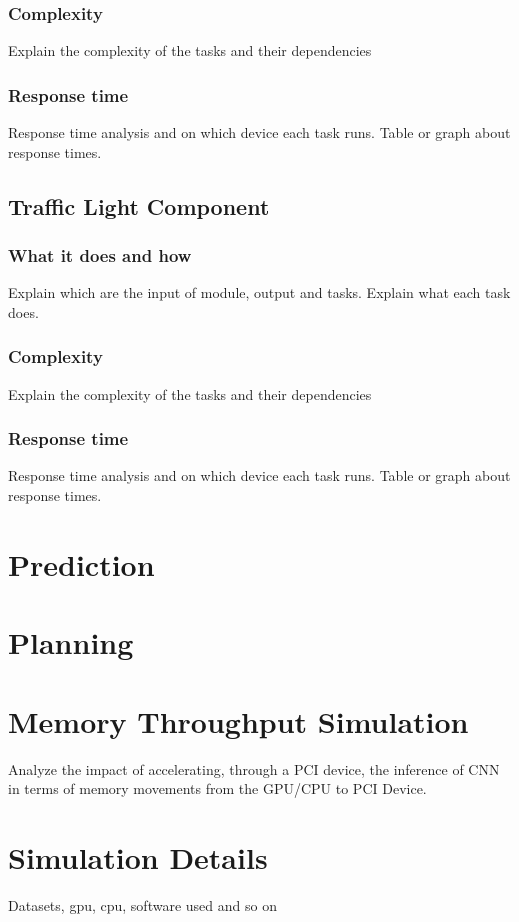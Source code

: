 \documentclass[conference]{IEEEtran}
\begin{document}
\subsubsection{Complexity}
Explain the complexity of the tasks and their dependencies
\subsubsection{Response time}
Response time analysis and on which device each task runs.
Table or graph about response times.

\subsection{Traffic Light Component}

\subsubsection{What it does and how}
Explain which are the input of module, output and tasks.
Explain what each task does.
\subsubsection{Complexity}
Explain the complexity of the tasks and their dependencies
\subsubsection{Response time}
Response time analysis and on which device each task runs.
Table or graph about response times.

\section{Prediction}

\section{Planning}

\section{Memory Throughput Simulation}
Analyze the impact of accelerating, through a PCI device, the inference of CNN in terms of memory movements from the GPU/CPU to PCI Device.


\section{Simulation Details}
Datasets, gpu, cpu, software used and so on
\end{document}
